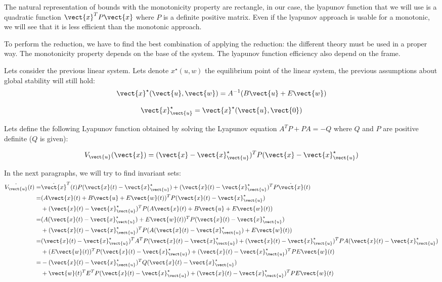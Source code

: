 The natural representation of bounds with the monotonicity property are rectangle, in our case, the lyapunov function that we will use is a quadratic function $\vect{x}^T P \vect{x}$ where $P$ is a definite positive matrix.
Even if the lyapunov approach is usable for a monotonic, we will see that it is less efficient than the monotonic approach.

To perform the reduction, we have to find the best combination of applying the reduction: the different theory must be used in a proper way. The monotonicity property depends on the base of the system. The lyapunov function efficiency also depend on the frame.

Lets consider the previous linear system.
Lets denote $x^\star(u,w)$ the equilibrium point of the linear system, the previous assumptions about global stability will still hold:
\begin{equation}
\vect{x}^\star(\vect{u},\vect{w}) = A^{-1} (B \vect{u} + E \vect{w})
\end{equation}

\begin{equation}
\vect{x}^{\star}_{\vect{u}} = \vect{x}^\star(\vect{u},\vect{0})
\end{equation}

Lets define the following Lyapunov function obtained by solving the Lyapunov equation $A^T P + P A = -Q$ where $Q$ and $P$ are positive definite ($Q$ is given):

\newcommand{\xu}{\vect{x}^{\star}_{\vect{u}}}
\newcommand{\Vu}{V_{\vect{u}}}
\begin{equation}
\Vu(\vect{x}) = (\vect{x} - \xu) ^T P (\vect{x} - \xu) 
\end{equation}

In the next paragraphs, we will try to find invariant sets:
\begin{align*}
\dot{\Vu}(t) =& \dot{\vect{x}}^T(t) P (\vect{x}(t) - \xu) +  (\vect{x}(t) - \xu)^T P \dot{\vect{x}}(t)
\\
 =& (A \vect{x}(t) + B \vect{u} + E \vect{w}(t))^T P (\vect{x}(t) - \xu)\\
 & + (\vect{x}(t) - \xu)^T P (A \vect{x}(t) + B \vect{u} + E \vect{w}(t))
\\
 =& (A (\vect{x}(t) - \xu) + E \vect{w}(t))^T P (\vect{x}(t) - \xu)\\
 & +(\vect{x}(t) - \xu)^T P (A (\vect{x}(t) - \xu)+ E \vect{w}(t))
\\
 =& (\vect{x}(t) - \xu)^T A^T P (\vect{x}(t) - \xu) +  (\vect{x}(t) - \xu)^T P A (\vect{x}(t) - \xu)\\
 & + (E \vect{w}(t))^T P (\vect{x}(t) - \xu) +  (\vect{x}(t) - \xu)^T P E \vect{w}(t)
\\
 =& - (\vect{x}(t) - \xu)^T Q (\vect{x}(t) - \xu)\\
 & +\vect{w}(t)^T E^T P (\vect{x}(t) - \xu) +  (\vect{x}(t) - \xu)^T P E \vect{w}(t)\\
\end{align*}

